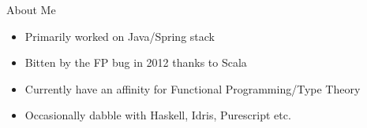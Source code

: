 \begin{frame}{About Me}
  \begin{itemize}
  \item Primarily worked on Java/Spring stack
  \item Bitten by the FP bug in 2012 thanks to Scala
  \item Currently have an affinity for Functional Programming/Type Theory
  \item Occasionally dabble with Haskell, Idris, Purescript etc.
  \end{itemize}
\end{frame}
